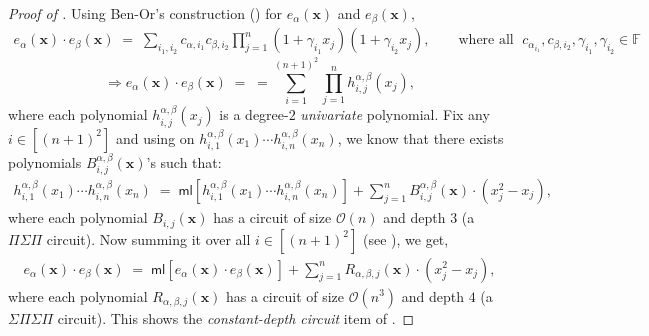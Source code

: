 \documentclass[11pt]{article}
\newcommand{\bigO}{\mathcal{O}}
\newcommand{\F}{\mathbb{F}}
\newcommand{\ml}{\mathsf{ml}}
\begin{document}
\begin{proof}[Proof of ]
Using Ben-Or's construction () for $e_{\alpha}(\mathbf{x})$ and $e_{\beta}(\mathbf{x})$,
\begin{align*}
    e_{\alpha}(\mathbf{x}) \cdot e_{\beta}(\mathbf{x}) \; = \; \sum_{i_{1}, i_{2}} c_{\alpha,i_{1}}  c_{\beta,i_{2}} \prod_{j=1}^{n} (1+\gamma_{i_{1}} x_{j}) (1+\gamma_{i_{2}} x_{j}), \quad \quad \text{where all } \; c_{\alpha_{i_{1}}}, c_{\beta, i_{2}}, \gamma_{i_{1}}, \gamma_{i_{2}} \in \F
\end{align*}
\begin{equation}\label{eqn:ml-prod-two-elem-1}
 \Rightarrow e_{\alpha}(\mathbf{x}) \cdot e_{\beta}(\mathbf{x}) \; = \; = \sum_{i=1}^{(n+1)^{2}} \prod_{j=1}^{n} h_{i,j}^{\alpha,\beta}(x_{j}),
\end{equation}
where each polynomial $h_{i,j}^{\alpha,\beta}(x_{j})$ is a degree-$2$ \emph{univariate} polynomial. Fix any $i \in [(n+1)^{2}]$ and using  on $h_{i,1}^{\alpha,\beta}(x_{1}) \cdots h_{i,n}^{\alpha, \beta}(x_{n})$, we know that there exists polynomials $B_{i,j}^{\alpha, \beta}(\mathbf{x})$'s such that:
\begin{align*}
    h_{i,1}^{\alpha,\beta}(x_{1}) \cdots h_{i,n}^{\alpha,\beta}(x_{n}) \; = \; \ml[h_{i,1}^{\alpha,\beta}(x_{1}) \cdots h_{i,n}^{\alpha,\beta}(x_{n})] + \sum_{j=1}^{n} B_{i,j}^{\alpha, \beta}(\mathbf{x}) \cdot (x_{j}^{2} - x_{j}),
\end{align*}
where each polynomial $B_{i,j}(\mathbf{x})$ has a circuit of size $\bigO(n)$ and depth $3$ (a $\Pi \Sigma \Pi$ circuit). Now summing it over all $i \in [(n+1)^{2}]$ (see ), we get,
\begin{align*}
    e_{\alpha}(\mathbf{x}) \cdot e_{\beta}(\mathbf{x}) \; = \; \ml[e_{\alpha}(\mathbf{x}) \cdot e_{\beta}(\mathbf{x})] + \sum_{j=1}^{n} R_{\alpha, \beta, j}(\mathbf{x}) \cdot (x_{j}^{2} - x_{j}),
\end{align*}
where each polynomial $R_{\alpha, \beta, j}(\mathbf{x})$ has a circuit of size $\bigO(n^{3})$ and depth $4$ (a $\Sigma \Pi \Sigma \Pi$ circuit). This shows the \emph{constant-depth circuit} item of .



\end{proof}
\end{document}

